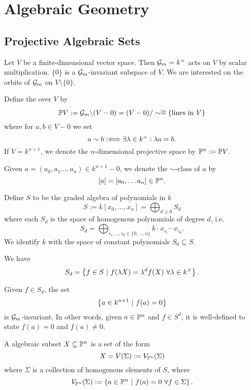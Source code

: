\section{Algebraic Geometry}
\subsection{Projective Algebraic Sets}
Let $V$ be a finite-dimensional vector space. Then $\G_m = k^\times$ acts on $V$ by scalar multiplication. $\{0\}$ is a $\G_m$-invariant subspace of $V$. We are interested on the orbits of $\G_m$ on $V\setminus \{0\}$.

Define the  over $V$ by
\[ \P V := \G_m \backslash (V - 0) = (V- 0)/ \sim \isom{} \{ \text{lines in } V \} \]
where for $a, b \in V-0$ we set
\[ a\sim b : \Gdw{} \exists \lambda \in k^\times : \lambda a = b. \]
If $V = k^{n+1}$, we denote the $n$-dimensional projective space by $\P^n := \P V$.

Given $a = (a_0,a_1\ldots, a_{n}) \in k^{n+1} - 0$, we denote the $\sim$-class of $a$ by
\[ [a] = [a_0, \ldots a_{n}] \in \P^n. \]

Define $S$ to be the graded algebra of polynomials in $k$
\[S:= k[x_0, \ldots, x_n] = \bigoplus_{d \geq 0} S_d\]
where each $S_d$ is the space of homogenous polynomials of degree $d$, i.e.
\[ S_d = \bigoplus_{i_1, \ldots, i_d \in \{0,\ldots, n\}} k \cdot x_{i_1} \cdots x_{i_d}. \]
We identify $k$ with the space of constant polynomials $S_0 \subseteq S$.

We have
\[ S_d = \set{f \in S}{f(\lambda X) = \lambda^d f(X) ~\forall \lambda \in k^\times}. \]

Given $f \in S_d$, the set
\[ \set{a \in k^{n+1}}{f(a) = 0} \]
is $\G_m$-invariant. In other words, given $a \in \P^n$ and $f \in S^d$, it is well-defined to state $f(a) = 0$ and $f(a) \neq 0$.

\begin{definition}
	A  algebraic subset $X \subseteq \P^n$ is a set of the form
	\[ X = V(\Sigma) := V_{\P^n}(\Sigma) \]
	where $\Sigma$ is a collection of homogenous elements of $S$, where
	\[ V_{\P^n}(\Sigma) := \set{a \in \P^n}{ f(a) = 0 ~ \forall f \in \Sigma }. \]
\end{definition}
